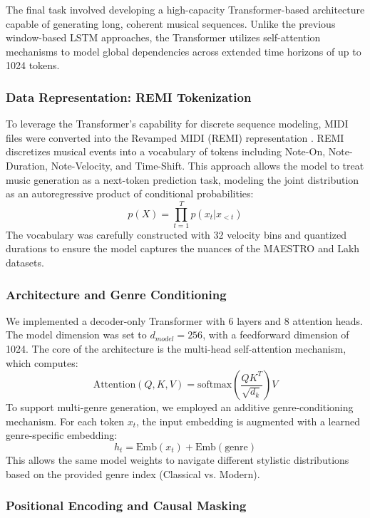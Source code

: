 \documentclass{article}
\theoremstyle{plain}
\theoremstyle{definition}
\theoremstyle{remark}
\begin{document}
The final task involved developing a high-capacity Transformer-based architecture capable of generating long, coherent musical sequences. Unlike the previous window-based LSTM approaches, the Transformer utilizes self-attention mechanisms to model global dependencies across extended time horizons of up to 1024 tokens.

\subsubsection{Data Representation: REMI Tokenization}

To leverage the Transformer's capability for discrete sequence modeling, MIDI files were converted into the Revamped MIDI (REMI) representation \cite{huang2020remi}. REMI discretizes musical events into a vocabulary of tokens including Note-On, Note-Duration, Note-Velocity, and Time-Shift. This approach allows the model to treat music generation as a next-token prediction task, modeling the joint distribution as an autoregressive product of conditional probabilities:
\[ p(X) = \prod_{t=1}^{T} p(x_t | x_{<t}) \]
The vocabulary was carefully constructed with 32 velocity bins and quantized durations to ensure the model captures the nuances of the MAESTRO and Lakh datasets.

\subsubsection{Architecture and Genre Conditioning}

We implemented a decoder-only Transformer \cite{vaswani2017attention} with 6 layers and 8 attention heads. The model dimension was set to $d_{model}=256$, with a feedforward dimension of 1024. The core of the architecture is the multi-head self-attention mechanism, which computes:
\[ \text{Attention}(Q, K, V) = \text{softmax}\left(\frac{QK^T}{\sqrt{d_k}}\right)V \]
To support multi-genre generation, we employed an additive genre-conditioning mechanism. For each token $x_t$, the input embedding is augmented with a learned genre-specific embedding:
\[ h_t = \text{Emb}(x_t) + \text{Emb}(\text{genre}) \]
This allows the same model weights to navigate different stylistic distributions based on the provided genre index (Classical vs. Modern).

\subsubsection{Positional Encoding and Causal Masking}
\end{document}
